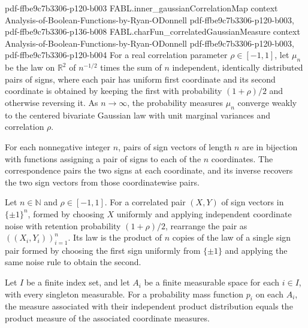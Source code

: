 \begin{theorem}
{    pdf-ffbe9c7b3306-p120-b003}
\proofstep
  {FABL.inner_gaussianCorrelationMap}
  {context}
  {Analysis-of-Boolean-Functions-by-Ryan-ODonnell}
  {pdf-ffbe9c7b3306-p120-b003,
    pdf-ffbe9c7b3306-p136-b008}
\proofstep
  {FABL.charFun_correlatedGaussianMeasure}
  {context}
  {Analysis-of-Boolean-Functions-by-Ryan-ODonnell}
  {pdf-ffbe9c7b3306-p120-b003,
    pdf-ffbe9c7b3306-p120-b004}
For a real correlation parameter $\rho\in[-1,1]$, let $\mu_n$ be the law on $\mathbb
R^2$ of $n^{-1/2}$ times the sum of $n$ independent, identically distributed pairs of
signs, where each pair has uniform first coordinate and its second coordinate is
obtained by keeping the first with probability $(1+\rho)/2$ and otherwise reversing it.
As $n\to\infty$, the probability measures $\mu_n$ converge weakly to the centered
bivariate Gaussian law with unit marginal variances and correlation $\rho$.
\end{theorem}

\begin{definition}
\label{FABL.pairCoordinatesEquiv}
\leanok
{}
For each nonnegative integer $n$, pairs of sign vectors of length $n$ are in bijection
with functions assigning a pair of signs to each of the $n$ coordinates. The
correspondence pairs the two signs at each coordinate, and its inverse recovers the two
sign vectors from those coordinatewise pairs.
\end{definition}

\begin{theorem}
\label{FABL.correlatedPairPMF_map_pairCoordinatesEquiv}
\leanok
{}
Let $n\in\mathbb N$ and $\rho\in[-1,1]$. For a correlated pair $(X,Y)$ of sign vectors
in $\{\pm1\}^n$, formed by choosing $X$ uniformly and applying independent coordinate
noise with retention probability $(1+\rho)/2$, rearrange the pair as
$((X_i,Y_i))_{i=1}^n$. Its law is the product of $n$ copies of the law of a single sign
pair formed by choosing the first sign uniformly from $\{\pm1\}$ and applying the same
noise rule to obtain the second.
\end{theorem}

\begin{theorem}
\label{FABL.independentProductPMF_toMeasure}
\leanok
{}
Let $I$ be a finite index set, and let $A_i$ be a finite measurable space for each $i\in
I$, with every singleton measurable. For a probability mass function $p_i$ on each
$A_i$, the measure associated with their independent product distribution equals the
product measure of the associated coordinate measures.
\end{theorem}

